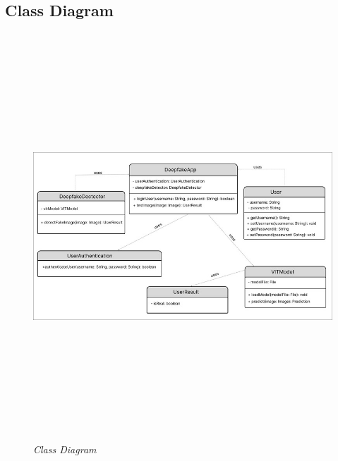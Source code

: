 
\subsection{Class Diagram}
\begin{figure}[h]
    \centering
    \includegraphics[width=6in,height=6in]{img/classdiagramfig.jpg}
    \caption{\textit{Class Diagram}}
\end{figure}
\justify